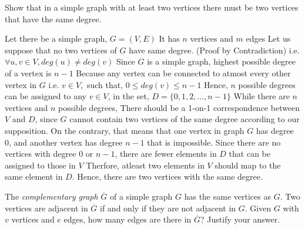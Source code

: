 \documentclass[addpoints]{exam}
\begin{document}
\begin{questions}
\question[5] Show that in a simple graph with at least two vertices there must be two vertices that have the same degree.
  \begin{solution}
    Let there be a simple graph, $G = (V, E)$
    \newline It has $n$ vertices and $m$ edges
    \newline Let us suppose that no two vertices of $G$ have same degree. (Proof by Contradiction)
    \newline i.e. $\forall u, v \in V, deg(u) \not = deg(v)$
    \newline Since $G$ is a simple graph, highest possible degree of a vertex is $n-1$
    \newline Because any vertex can be connected to atmost every other vertex in $G$
    \newline i.e. $v \in V,$ such that, $0 \leq deg(v) \leq n-1$
    \newline Hence, $n$ possible degrees can be assigned to any $v \in V$, in the set, $D = \{ 0, 1, 2, ..., n-1 \}$
    \newline
    While there are $n$ vertices and $n$ possible degrees, 
    \newline There should be a 1-on-1 correspondence between $V$ and $D$, since $G$ cannot contain two vertices of the same degree according to our supposition.
    \newline On the contrary, that means that one vertex in graph $G$ has degree 0, and another vertex has degree $n-1$ that is impossible.
    \newline 
    \newline Since there are no vertices with degree $0$ or $n-1$, there are fewer elements in $D$ that can be assigned to those in $V$
    \newline Therfore, atleast two elements in $V$ should map to the same element in $D$.
    \newline Hence, there are two vertices with the same degree. 

  \end{solution}
  
\question[5] The \textit{complementary graph} $\overline{G}$ of a simple graph $G$ has the same vertices as  $G$. Two vertices are adjacent in $\overline{G}$ if and only if they are not adjacent in $G$. Given $G$ with $v$ vertices and $e$ edges, how many edges are there in $\overline{G}$? Justify your answer.
  \begin{solution}
  \end{solution}
  

\end{questions}
\end{document}
